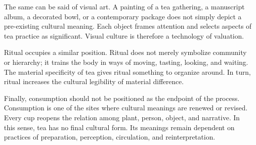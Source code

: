 \documentclass[numbers]{IntechOpen-Book}
\begin{document}
The same can be said of visual art. A painting of a tea gathering, a manuscript album, a decorated bowl, or a contemporary package does not simply depict a pre-existing cultural meaning. Each object frames attention and selects aspects of tea practice as significant. Visual culture is therefore a technology of valuation.

Ritual occupies a similar position. Ritual does not merely symbolize community or hierarchy; it trains the body in ways of moving, tasting, looking, and waiting. The material specificity of tea gives ritual something to organize around. In turn, ritual increases the cultural legibility of material difference.

Finally, consumption should not be positioned as the endpoint of the process. Consumption is one of the sites where cultural meanings are renewed or revised. Every cup reopens the relation among plant, person, object, and narrative. In this sense, tea has no final cultural form. Its meanings remain dependent on practices of preparation, perception, circulation, and reinterpretation.
\end{document}
